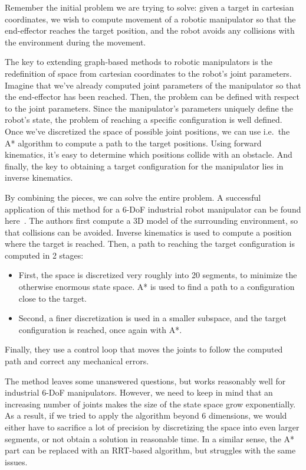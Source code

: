 Remember the initial problem we are trying to solve: given a target in cartesian coordinates, we wish to compute movement of a robotic manipulator so that the end-effector reaches the target position, and the robot avoids any collisions with the environment during the movement.

The key to extending graph-based methods to robotic manipulators is the redefinition of space from cartesian coordinates to the robot's joint parameters. Imagine that we've already computed joint parameters of the manipulator so that the end-effector has been reached. Then, the problem can be defined with respect to the joint parameters.
Since the manipulator's parameters uniquely define the robot's state, the problem of reaching a specific configuration is well defined. Once we've discretized the space of possible joint positions, we can use i.e.\ the A* algorithm to compute a path to the target positions. Using forward kinematics, it's easy to determine which positions collide with an obstacle. And finally, the key to obtaining a target configuration for the manipulator lies in inverse kinematics.

By combining the pieces, we can solve the entire problem. A successful application of this method for a 6-DoF industrial robot manipulator can be found here~\cite{doubleA_star}. The authors first compute a 3D model of the surrounding environment, so that collisions can be avoided. Inverse kinematics is used to compute a position where the target is reached. Then, a path to reaching the target configuration is computed in 2 stages:

\begin{itemize}
\item First, the space is discretized very roughly into 20 segments, to minimize the otherwise enormous state space. A* is used to find a path to a configuration close to the target.
\item Second, a finer discretization is used in a smaller subspace, and the target configuration is reached, once again with A*.
\end{itemize}

Finally, they use a control loop that moves the joints to follow the computed path and correct any mechanical errors.

The method leaves some unanswered questions, but works reasonably well for industrial 6-DoF manipulators. However, we need to keep in mind that an increasing number of joints makes the size of the state space grow exponentially. As a result, if we tried to apply the algorithm beyond 6 dimensions, we would either have to sacrifice a lot of precision by discretizing the space into even larger segments, or not obtain a solution in reasonable time. In a similar sense, the A* part can be replaced with an RRT-based algorithm, but struggles with the same issues.

